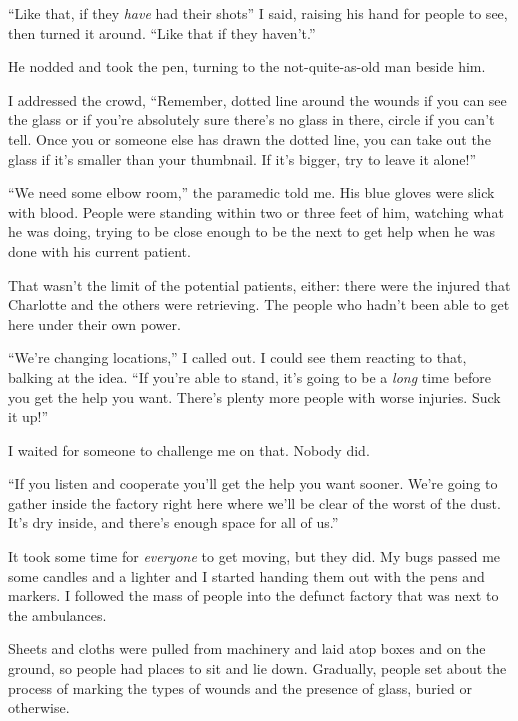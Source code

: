 ``Like that, if they \emph{have} had their shots'' I said, raising his hand for people to see, then turned it around.  ``Like that if they haven't.''



He nodded and took the pen, turning to the not-quite-as-old man beside him.



I addressed the crowd, ``Remember, dotted line around the wounds if you can see the glass or if you're absolutely sure there's no glass in there, circle if you can't tell.  Once you or someone else has drawn the dotted line, you can take out the glass if it's smaller than your thumbnail.  If it's bigger, try to leave it alone!''



``We need some elbow room,'' the paramedic told me.  His blue gloves were slick with blood.  People were standing within two or three feet of him, watching what he was doing, trying to be close enough to be the next to get help when he was done with his current patient.



That wasn't the limit of the potential patients, either: there were the injured that Charlotte and the others were retrieving.  The people who hadn't been able to get here under their own power.



``We're changing locations,'' I called out.  I could see them reacting to that, balking at the idea.  ``If you're able to stand, it's going to be a \emph{long} time before you get the help you want.  There's plenty more people with worse injuries.  Suck it up!''



I waited for someone to challenge me on that.  Nobody did.



``If you listen and cooperate you'll get the help you want sooner.  We're going to gather inside the factory right here where we'll be clear of the worst of the dust.  It's dry inside, and there's enough space for all of us.''



It took some time for \emph{everyone} to get moving, but they did.  My bugs passed me some candles and a lighter and I started handing them out with the pens and markers.  I followed the mass of people into the defunct factory that was next to the ambulances.



Sheets and cloths were pulled from machinery and laid atop boxes and on the ground, so people had places to sit and lie down.  Gradually, people set about the process of marking the types of wounds and the presence of glass, buried or otherwise.



